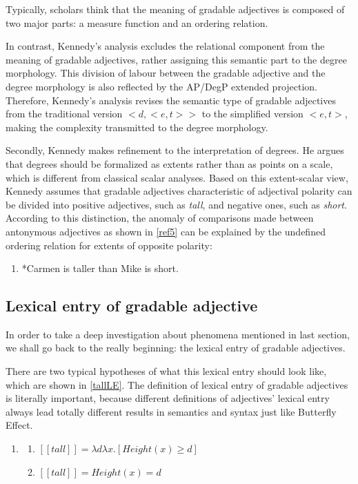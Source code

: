 \documentclass{ctexart}
\let \cite \parencite
\begin{document}
Typically, scholars think that the meaning of gradable adjectives is composed of two major parts: a measure function and an ordering relation\cite{carston2013,horn1992}.

In contrast, Kennedy’s analysis excludes the relational component from the meaning of gradable adjectives, rather assigning this semantic part to the degree morphology. This division of labour between the gradable adjective and the degree morphology is also reflected by the AP/DegP extended projection. Therefore, Kennedy’s analysis revises the semantic type of gradable adjectives from the traditional version $<d,<e,t>>$ to the simplified version $<e,t>$, making the complexity transmitted to the degree morphology.

Secondly, Kennedy makes refinement to the interpretation of degrees. He argues that degrees should be formalized as extents\cite{seuren1978,von1984b,bierwisch1989,lobner2010} rather than as points on a scale, which is different from classical scalar analyses. Based on this extent-scalar view, Kennedy assumes that gradable adjectives characteristic of adjectival polarity can be divided into positive adjectives, such as \textit{tall}, and negative ones, such as \textit{short}. According to this distinction, the anomaly of comparisons made between antonymous adjectives as shown in \ref{ref5} can be explained by the undefined ordering relation for extents of opposite polarity:

\begin{enumerate}[resume]
\item \label{ref5}
*Carmen is taller than Mike is short.
\end{enumerate}

\subsection{Lexical entry of gradable adjective}

In order to take a deep investigation about phenomena mentioned in last section, we shall go back to the really beginning: the lexical entry of gradable adjectives. 

There are two typical hypotheses of what this lexical entry should look like, which are shown in \ref{tallLE}. The definition of lexical entry of gradable adjectives is literally important, because different definitions of adjectives' lexical entry always lead totally different results in semantics and syntax just like Butterfly Effect.

\begin{enumerate}[resume]
    \item \label{tallLE}
    
    \begin{enumerate}[ref=(\arabic{enumi}\alph*)]
        \item \label{tallLE_a} 
        $[\![tall]\!]=\lambda d \lambda x.[Height(x) \geq d]$
    
        \item \label{tallLE_b} 
        $[\![tall]\!]=Height(x)=d$
    
    \end{enumerate}
\end{enumerate}
\end{document}
